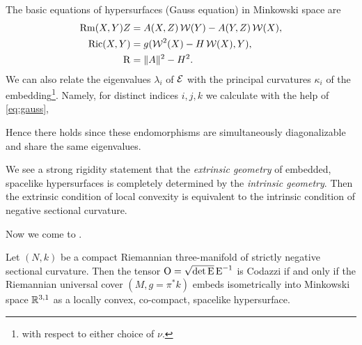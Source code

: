 \documentclass[a4paper,12pt]{amsart}
\begin{document}
The basic equations of hypersurfaces (Gauss equation) in Minkowski space are
\begin{equation}
\label{eq:gauss}
\begin{split}
\operatorname{Rm}(X, Y) Z &= A(X, Z) \operatorname{\mathcal{W}}(Y) - A(Y, Z) \operatorname{\mathcal{W}}(X), \\
\operatorname{Ric}(X, Y) &= g(\operatorname{\mathcal{W}}^2(X) - H \operatorname{\mathcal{W}}(X), Y), \\
\operatorname{R} &= \|A\|^2 - H^2.
\end{split}
\end{equation}
We can also relate the eigenvalues $\lambda_{i}$ of $\operatorname{\mathcal{E}}$ with the principal curvatures $\kappa_{i}$ of the embedding\footnote{with respect to either choice of $\nu$.}. Namely, for distinct indices \(i,j,k\) we calculate with the help of \eqref{eq:gauss},

Hence there holds
since these endomorphisms are simultaneously diagonalizable and share the same eigenvalues.
\begin{rem}
We see a strong rigidity statement that the \emph{extrinsic geometry} of embedded, spacelike hypersurfaces is completely determined by the \emph{intrinsic geometry}. Then the extrinsic condition of local convexity is equivalent to the intrinsic condition of negative sectional curvature.
\end{rem}

Now we come to .




\begin{thm}
\label{thm:intg_embed}

Let \((N, k)\) be a compact Riemannian three-manifold of strictly negative sectional curvature. Then the tensor \(\operatorname{O} = \sqrt{\det \operatorname{E}} \operatorname{E}^{-1}\) is Codazzi if and only if the Riemannian universal cover \((M, g = \pi^{\ast} k)\) embeds isometrically into Minkowski space \(\mathbb{R}^{3,1}\) as a locally convex, co-compact, spacelike hypersurface.
\end{thm}
\end{document}
